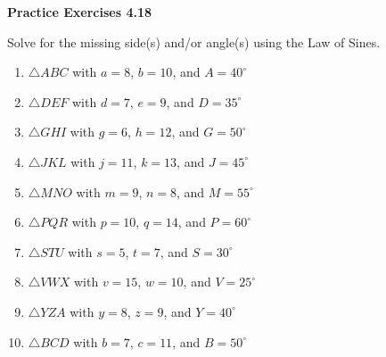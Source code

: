 \vspace{0.3ex}
\noindent\textbf{Practice Exercises 4.18}

\vspace{0.2ex}

Solve for the missing side(s) and/or angle(s) using the Law of Sines. 

\begin{enumerate}
    \item \(\triangle ABC\) with \(a = 8\), \(b = 10\), and \(A = 40^\circ\)
    \item \(\triangle DEF\) with \(d = 7\), \(e = 9\), and \(D = 35^\circ\)
    \item \(\triangle GHI\) with \(g = 6\), \(h = 12\), and \(G = 50^\circ\)
    \item \(\triangle JKL\) with \(j = 11\), \(k = 13\), and \(J = 45^\circ\)
    \item \(\triangle MNO\) with \(m = 9\), \(n = 8\), and \(M = 55^\circ\)
    \item \(\triangle PQR\) with \(p = 10\), \(q = 14\), and \(P = 60^\circ\)
    \item \(\triangle STU\) with \(s = 5\), \(t = 7\), and \(S = 30^\circ\)
    \item \(\triangle VWX\) with \(v = 15\), \(w = 10\), and \(V = 25^\circ\)
    \item \(\triangle YZA\) with \(y = 8\), \(z = 9\), and \(Y = 40^\circ\)
    \item \(\triangle BCD\) with \(b = 7\), \(c = 11\), and \(B = 50^\circ\)
\end{enumerate}

